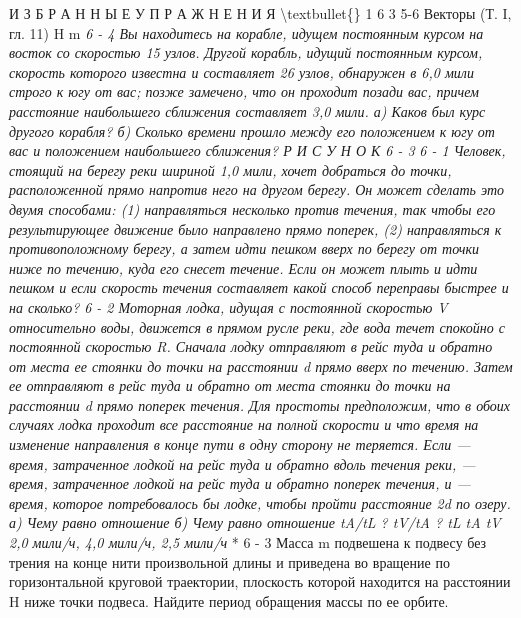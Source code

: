 \documentclass[10pt,oneside]{article}
\begin{document}
И З Б Р А Н Н Ы Е  У П Р А Ж Н Е Н И Я \textbackslash{}textbullet\{\} 1 6 3 5-6 Векторы (Т. I, гл. 11) H m \emph{ } \emph{ 6 - 4 Вы находитесь на корабле, идущем постоянным курсом на восток со скоростью 15 узлов. Другой корабль, идущий постоянным курсом, скорость которого известна и составляет 26 узлов, обнаружен в 6,0 мили строго к югу от вас; позже замечено, что он проходит позади вас, причем расстояние наибольшего сближения составляет 3,0 мили. а) Каков был курс другого корабля? б) Сколько времени прошло между его положением к югу от вас и положением наибольшего сближения? Р И С У Н О К  6 - 3 } \emph{ 6 - 1 Человек, стоящий на берегу реки шириной 1,0 мили, хочет добраться до точки, расположенной прямо напротив него на другом берегу. Он может сделать это двумя способами: (1) направляться несколько против течения, так чтобы его результирующее движение было направлено прямо поперек, (2) направляться к противоположному берегу, а затем идти пешком вверх по берегу от точки ниже по течению, куда его снесет течение. Если он может плыть и идти пешком и если скорость течения составляет какой способ переправы быстрее и на сколько? } \emph{ 6 - 2 Моторная лодка, идущая с постоянной скоростью V относительно воды, движется в прямом русле реки, где вода течет спокойно с постоянной скоростью R. Сначала лодку отправляют в рейс туда и обратно от места ее стоянки до точки на расстоянии d прямо вверх по течению. Затем ее отправляют в рейс туда и обратно от места стоянки до точки на расстоянии d прямо поперек течения. Для простоты предположим, что в обоих случаях лодка проходит все расстояние на полной скорости и что время на изменение направления в конце пути в одну сторону не теряется. Если --- время, затраченное лодкой на рейс туда и обратно вдоль течения реки, --- время, затраченное лодкой на рейс туда и обратно поперек течения, и --- время, которое потребовалось бы лодке, чтобы пройти расстояние 2d по озеру. а) Чему равно отношение б) Чему равно отношение tA/tL ? tV/tA ? tL tA tV 2,0 мили/ч, 4,0 мили/ч, 2,5 мили/ч } * 6 - 3 Масса m подвешена к подвесу без трения на конце нити произвольной длины и приведена во вращение по горизонтальной круговой траектории, плоскость которой находится на расстоянии H ниже точки подвеса. Найдите период обращения массы по ее орбите.\par
\end{document}

